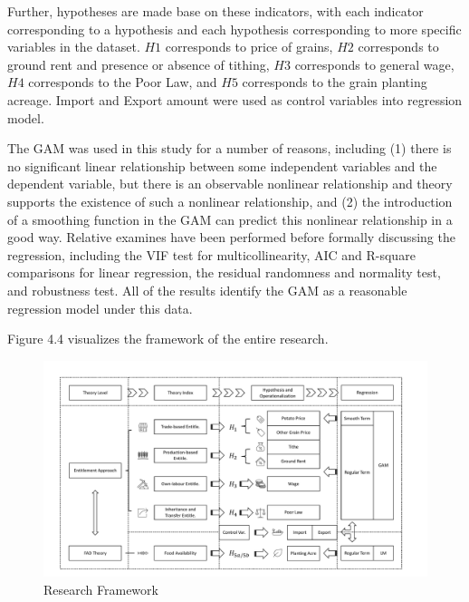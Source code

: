 Further, hypotheses are made base on these indicators, with each indicator corresponding to a hypothesis and each hypothesis corresponding to more specific variables in the dataset. $H1$ corresponds to price of grains, $H2$ corresponds to ground rent and presence or absence of tithing, $H3$ corresponds to general wage, $H4$ corresponds to the Poor Law, and $H5$ corresponds to the grain planting acreage. Import and Export amount were used as control variables into regression model.

The GAM was used in this study for a number of reasons, including (1) there is no significant linear relationship between some independent variables and the dependent variable, but there is an observable nonlinear relationship and theory supports the existence of such a nonlinear relationship, and (2) the introduction of a smoothing function in the GAM can predict this nonlinear relationship in a good way. Relative examines have been performed before formally discussing the regression, including the VIF test for multicollinearity, AIC and R-square comparisons for linear regression, the residual randomness and normality test, and robustness test. All of the results identify the GAM as a reasonable regression model under this data.

Figure 4.4 visualizes the framework of the entire research.

\begin{landscape}
    \begin{figure}[h]
        \centering
        \caption{Research Framework}
        \includegraphics[width=1.5\textheight]{../03_outputs/Framework.pdf}
    \end{figure}
\end{landscape}
